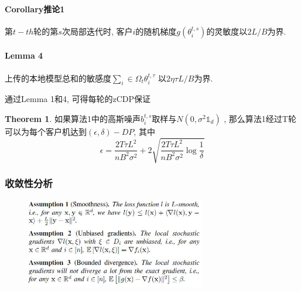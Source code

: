 \documentclass[a4paper]{article}
\theoremstyle{definition}
\newtheorem{theorem}{Theorem}[section]
\numberwithin{equation}{section}
\begin{document}
\paragraph{Corollary推论1} 第$t-th $轮的第$s$次局部迭代时, 客户$i$的随机梯度$g(\theta_i^{t,s})$的灵敏度以$2L/B$为界. 

\paragraph{Lemma 4 } 
上传的本地模型总和的敏感度$\sum_i \in \Omega_t \theta^{t, \tau}_i$
以$2 \eta \tau L/B$为界. 

通过Lemma 1和4, 可得每轮的zCDP保证

\begin{theorem}
如果算法1中的高斯噪声$b_i^{t,s}$取样与$N(0, \sigma^2 \mathbb{1}_d)$
, 那么算法1经过T轮可以为每个客户机达到$(\epsilon,\delta)-DP$, 其中 
\begin{equation}
    \epsilon = \frac{2T\tau L^2}{n B^2 \sigma^2}+ 2 \sqrt{\frac{2T\tau L^2 }{nB^2\sigma^2} \log\frac{1}{\delta}} 
\end{equation}
\end{theorem}

\subsubsection{收敛性分析}

\begin{figure}[ht]
    \setlength{\abovecaptionskip}{0.1cm}
    \centering    
    \includegraphics[width=0.7\textwidth]{CPFed/Assumption123.jpg}
    \label{assumption123}
\end{figure}
\end{document}
